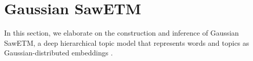 \documentclass{article}
\begin{document}
\section{Gaussian SawETM}\label{sec:Gaussian SawETM}
In this section, we elaborate on the construction and inference of Gaussian SawETM,
a deep hierarchical topic model that represents words and topics as Gaussian-distributed embeddings \cite{vilnis2014word}. 
\end{document}
